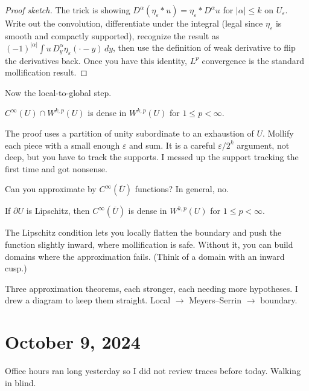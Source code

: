 \begin{proof}[Proof sketch]
The trick is showing $D^\alpha(\eta_\varepsilon * u) = \eta_\varepsilon * D^\alpha u$ for $|\alpha| \leq k$ on $U_\varepsilon$. Write out the convolution, differentiate under the integral (legal since $\eta_\varepsilon$ is smooth and compactly supported), recognize the result as $(-1)^{|\alpha|} \int u \, D^\alpha_y \eta_\varepsilon(\cdot - y) \, dy$, then use the definition of weak derivative to flip the derivatives back. Once you have this identity, $L^p$ convergence is the standard mollification result.
\end{proof}

Now the local-to-global step.

\begin{theorem}
\label{thm:meyers-serrin}
$C^\infty(U) \cap W^{k,p}(U)$ is dense in $W^{k,p}(U)$ for $1 \leq p < \infty$.
\end{theorem}

The proof uses a partition of unity subordinate to an exhaustion of $U$. Mollify each piece with a small enough $\varepsilon$ and sum. It is a careful $\varepsilon/2^k$ argument, not deep, but you have to track the supports. I messed up the support tracking the first time and got nonsense.

Can you approximate by $C^\infty(\overline{U})$ functions? In general, no.

\begin{theorem}
\label{thm:global-approx-boundary}
If $\partial U$ is Lipschitz, then $C^\infty(\overline{U})$ is dense in $W^{k,p}(U)$ for $1 \leq p < \infty$.
\end{theorem}

The Lipschitz condition lets you locally flatten the boundary and push the function slightly inward, where mollification is safe. Without it, you can build domains where the approximation fails. (Think of a domain with an inward cusp.)

Three approximation theorems, each stronger, each needing more hypotheses. I drew a diagram to keep them straight. Local $\to$ Meyers--Serrin $\to$ boundary.



\section{October 9, 2024}

Office hours ran long yesterday so I did not review traces before today. Walking in blind.

